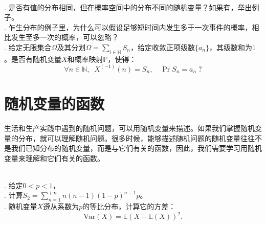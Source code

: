 \documentclass[12pt,UTF8]{ctexbook}
\begin{document}
\begin{sk}
    \mbox{} \\
    . 是否有值的分布相同，但在概率空间中的分布不同的随机变量？如果有，举出例子。\\
    . 乍生分布的例子里，为什么可以假设足够短时间内发生多于一次事件的概率，相比发生至多一次的概率，可以忽略？\\
    . 给定无限集合$\Omega$及其分划$\Omega = \sum_{i\in\mathbb{N}} S_n$，给定收敛正项级数$\{a_n\}$，其级数和为$1$。是否有随机变量$X$和概率映射$\mathbb{P}$，使得：
    $$ \forall n\in\mathbb{N}, \;\; X^{(-1)} (n) = S_n, \quad \Pr{S_n} = a_n \; ?$$
\end{sk}

\section{随机变量的函数}

生活和生产实践中遇到的随机问题，可以用随机变量来描述。如果我们掌握随机变量的分布，就可以理解随机问题。很多时候，能够描述随机问题的随机变量往往不是我们已知分布的随机变量，而是与它们有关的函数，因此，我们需要学习用随机变量来理解和它们有关的函数。

\begin{ex}
    
\end{ex}

\begin{xt}
    \mbox{} \\
    . 给定$0<p<1$，\\
    . 计算$S_2 = \sum_{n=1}^{+\infty} n(n - 1)(1 - p)^{n-1} p$。\\
    . 随机变量$X$遵从系数为$p$的等比分布，计算它的方差：
    $$ \mathrm{Var}(X) = \mathbb{E}(X - \mathbb{E}(X))^2.$$
\end{xt}








\end{document}
